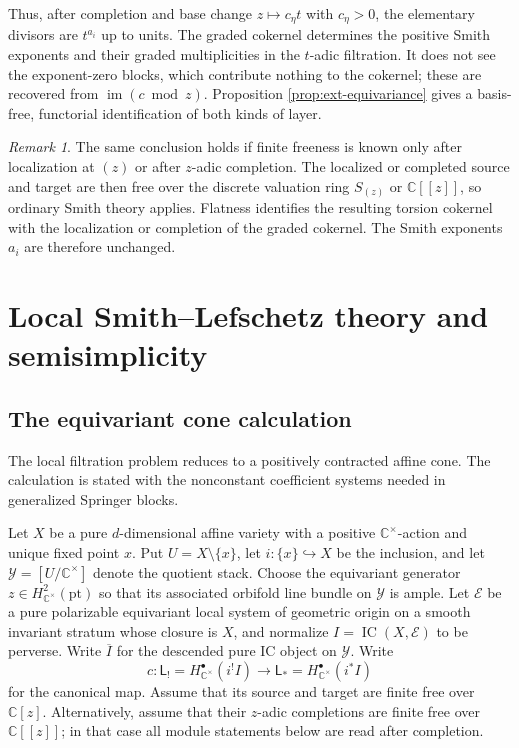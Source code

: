 \documentclass[11pt]{amsart}
\theoremstyle{definition}
\theoremstyle{remark}
\newtheorem{remark}[theorem]{Remark}
\newcommand{\IC}{\operatorname{IC}}
\begin{document}
Thus, after completion and base change $z\mapsto c_\eta t$ with
$c_\eta>0$, the elementary divisors are $t^{a_i}$ up to units.  The graded
cokernel determines the positive Smith exponents and their graded
multiplicities in the $t$-adic filtration.  It does not see the
exponent-zero blocks, which contribute nothing to the cokernel; these are
recovered from $\operatorname{im}(c\bmod z)$.  Proposition
\ref{prop:ext-equivariance} gives a basis-free, functorial identification of
both kinds of layer.

\begin{remark}\label{rem:completed-smith}
The same conclusion holds if finite freeness is known only after localization
at $(z)$ or after $z$-adic completion.  The localized or completed source and
target are then free over the discrete valuation ring $S_{(z)}$ or
$\mathbb C[[z]]$, so ordinary Smith theory applies.  Flatness identifies the
resulting torsion cokernel with the localization or completion of the graded
cokernel.  The Smith exponents $a_i$ are therefore unchanged.
\end{remark}

\section{Local Smith--Lefschetz theory and semisimplicity}
\label{sec:local-smith}

\subsection{The equivariant cone calculation}

The local filtration problem reduces to a positively contracted affine
cone.  The calculation is stated with the nonconstant coefficient
systems needed in generalized Springer blocks.

Let $X$ be a pure $d$-dimensional affine variety with a positive
$\mathbb C^\times$-action and unique fixed point $x$.  Put
$U=X\setminus\{x\}$, let $i:\{x\}\hookrightarrow X$ be the inclusion, and
let $\mathcal Y=[U/\mathbb C^\times]$ denote the quotient stack.  Choose the
equivariant generator
$z\in H^2_{\mathbb C^\times}(\mathrm{pt})$ so that its associated orbifold
line bundle on $\mathcal Y$ is ample.  Let
$\mathcal E$ be a pure polarizable equivariant local system of geometric
origin on a smooth invariant
stratum whose closure is $X$, and normalize
$I=\IC(X,\mathcal E)$ to be perverse.  Write $\overline I$ for the descended
pure IC object on $\mathcal Y$.  Write
\[
 c:\mathsf L_!=H^\bullet_{\mathbb C^\times}(i^!I)
 \longrightarrow
 \mathsf L_*=H^\bullet_{\mathbb C^\times}(i^*I)
\]
for the canonical map.  Assume that its source and target
are finite free over $\mathbb C[z]$.  Alternatively, assume that their
$z$-adic completions are finite free over $\mathbb C[[z]]$; in that case all
module statements below are read after completion.
\end{document}
